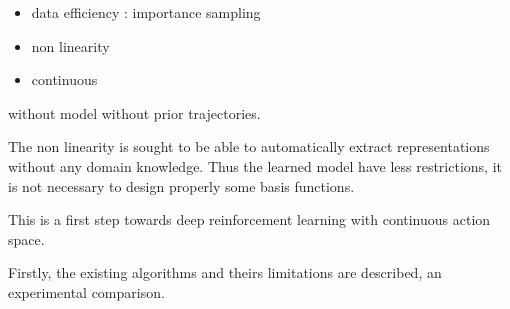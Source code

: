 


\begin{itemize}
 \item data efficiency : importance sampling
 \item non linearity
 \item continuous
\end{itemize}

without model without prior trajectories.



The non linearity is sought to be able to automatically extract representations
without any domain knowledge. Thus the learned model have less restrictions,
it is not necessary to design properly some basis functions.

This is a first step towards deep reinforcement learning with continuous action space.

Firstly, the existing algorithms and theirs limitations are described, 
an experimental comparison.




